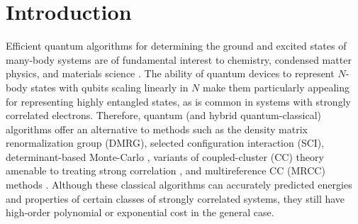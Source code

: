 \documentclass[aps,prx, reprint]{revtex4-2}
\begin{document}
\section{Introduction}
Efficient quantum algorithms for determining the ground and excited states of many-body systems are of fundamental interest to chemistry, condensed matter physics, and materials science \cite{Lloyd:1996ch, aspuru2005simulated, kandala2017hardware, kandala2019error}.
The ability of quantum devices to represent $N$-body states with qubits scaling linearly in $N$ make them particularly appealing for representing highly entangled states, as is common in systems with strongly correlated electrons.
Therefore, quantum (and hybrid quantum-classical) algorithms offer an alternative to methods such as the density matrix renormalization group \cite{White1992DensityMatrix} (DMRG), selected configuration interaction \cite{Huron1973IterativePerturbation, Buenker1974IndividualizedConfiguration} (SCI),  determinant-based Monte-Carlo \cite{Booth2009FermionMonte}, variants of coupled-cluster (CC) theory \cite{coester1960short, vcivzek1966correlation} amenable to treating strong correlation \cite{Piecuch:1990wa,piecuch2005renormalized, Limacher2013NewMean, Bulik2015CanSingle}, and multireference CC (MRCC) methods \cite{vcivzek1969use, lindgren1978coupled, jeziorski1981coupled,Lyakh:2012cn,Kohn:2013cp,evangelista2018perspective}.
Although these classical algorithms can accurately predicted energies and properties of certain classes of strongly correlated systems, they still have high-order polynomial or exponential cost in the general case.
\end{document}
